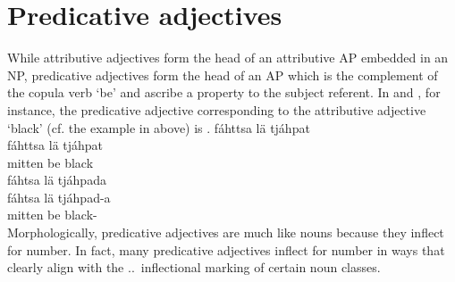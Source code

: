 \section{Predicative adjectives}\label{predADJ}%
While attributive adjectives form the head of an attributive AP embedded in an NP, predicative adjectives form the head of an AP which is the complement of the copula verb  ‘be’ and ascribe a property to the subject referent. %
In  and , for instance, the predicative adjective corresponding to the attributive adjective  ‘black’ (cf. the example in  above) is . %
\ea\label{adjPredEx1}
\glll	fáhttsa lä tjáhpat\\
	fáhttsa lä tjáhpat\\
	mitten\BS{} be\BS{} black\BS{}\\\nopagebreak
{}	
\z
\ea\label{adjPredEx2}
\glll	fáhtsa lä tjáhpada\\
	fáhtsa lä tjáhpad-a\\
	mitten\BS{} be\BS{} black-\\\nopagebreak
{}	
\z
Morphologically, predicative adjectives are much like nouns because they inflect for number. In fact, many predicative adjectives inflect for number in ways that clearly align with the \NOMs.\SGs\TILDE\NOMs.\PLs\ inflectional marking of certain noun classes. 
